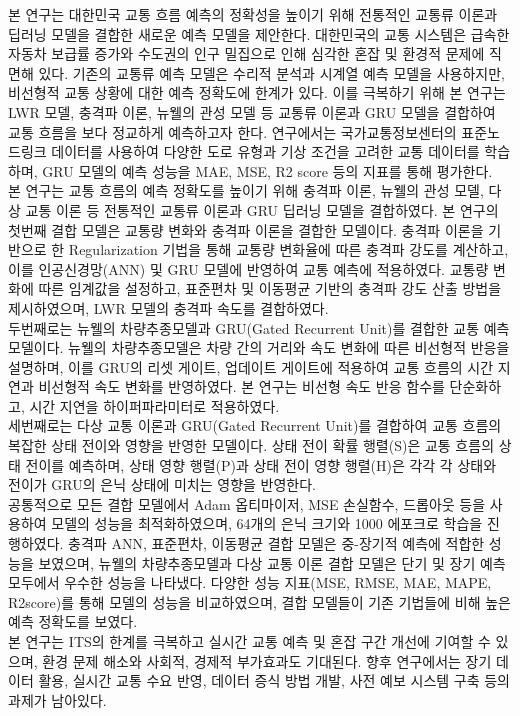 \documentclass[11pt]{report}
\begin{document}
\normalsize
본 연구는 대한민국 교통 흐름 예측의 정확성을 높이기 위해 전통적인 교통류 이론과 딥러닝 모델을 결합한 새로운 예측 모델을 제안한다. 
대한민국의 교통 시스템은 급속한 자동차 보급률 증가와 수도권의 인구 밀집으로 인해 심각한 혼잡 및 환경적 문제에 직면해 있다. 
기존의 교통류 예측 모델은 수리적 분석과 시계열 예측 모델을 사용하지만, 비선형적 교통 상황에 대한 예측 정확도에 한계가 있다. 
이를 극복하기 위해 본 연구는 LWR 모델, 충격파 이론, 뉴웰의 관성 모델 등 교통류 이론과 GRU 모델을 결합하여 교통 흐름을 보다 정교하게 예측하고자 한다. 
연구에서는 국가교통정보센터의 표준노드링크 데이터를 사용하여 다양한 도로 유형과 기상 조건을 고려한 교통 데이터를 학습하며, GRU 모델의 예측 성능을 MAE, MSE, R2 score 등의 지표를 통해 평가한다. \\
\indent 본 연구는 교통 흐름의 예측 정확도를 높이기 위해 충격파 이론, 뉴웰의 관성 모델, 다상 교통 이론 등 전통적인 교통류 이론과 GRU 딥러닝 모델을 결합하였다.
본 연구의 첫번째 결합 모델은 교통량 변화와 충격파 이론을 결합한 모델이다.
충격파 이론을 기반으로 한 Regularization 기법을 통해 교통량 변화율에 따른 충격파 강도를 계산하고, 이를 인공신경망(ANN) 및 GRU 모델에 반영하여 교통 예측에 적용하였다. 
교통량 변화에 따른 임계값을 설정하고, 표준편차 및 이동평균 기반의 충격파 강도 산출 방법을 제시하였으며, LWR 모델의 충격파 속도를 결합하였다. \\
\indent 두번째로는 뉴웰의 차량추종모델과 GRU(Gated Recurrent Unit)를 결합한 교통 예측 모델이다.
뉴웰의 차량추종모델은 차량 간의 거리와 속도 변화에 따른 비선형적 반응을 설명하며, 이를 GRU의 리셋 게이트, 업데이트 게이트에 적용하여 교통 흐름의 시간 지연과 비선형적 속도 변화를 반영하였다. 
본 연구는 비선형 속도 반응 함수를 단순화하고, 시간 지연을 하이퍼파라미터로 적용하였다. \\
\indent 세번째로는 다상 교통 이론과 GRU(Gated Recurrent Unit)를 결합하여 교통 흐름의 복잡한 상태 전이와 영향을 반영한 모델이다.
상태 전이 확률 행렬(S)은 교통 흐름의 상태 전이를 예측하며, 상태 영향 행렬(P)과 상태 전이 영향 행렬(H)은 각각 각 상태와 전이가 GRU의 은닉 상태에 미치는 영향을 반영한다. \\
\indent 공통적으로 모든 결합 모델에서 Adam 옵티마이저, MSE 손실함수, 드롭아웃 등을 사용하여 모델의 성능을 최적화하였으며, 64개의 은닉 크기와 1000 에포크로 학습을 진행하였다.
충격파 ANN, 표준편차, 이동평균 결합 모델은 중-장기적 예측에 적합한 성능을 보였으며, 뉴웰의 차량추종모델과 다상 교통 이론 결합 모델은 단기 및 장기 예측 모두에서 우수한 성능을 나타냈다. 
다양한 성능 지표(MSE, RMSE, MAE, MAPE, R2score)를 통해 모델의 성능을 비교하였으며, 결합 모델들이 기존 기법들에 비해 높은 예측 정확도를 보였다. \\
\indent 본 연구는 ITS의 한계를 극복하고 실시간 교통 예측 및 혼잡 구간 개선에 기여할 수 있으며, 환경 문제 해소와 사회적, 경제적 부가효과도 기대된다. 
향후 연구에서는 장기 데이터 활용, 실시간 교통 수요 반영, 데이터 증식 방법 개발, 사전 예보 시스템 구축 등의 과제가 남아있다.
\par\vspace{1cm}
\end{document}
